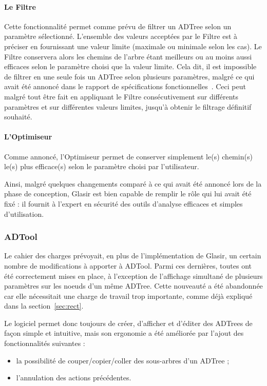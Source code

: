 \paragraph{Le Filtre} Cette fonctionnalité permet comme prévu de filtrer un ADTree selon un paramètre sélectionné. L'ensemble des valeurs acceptées par le Filtre est à préciser en fournissant une valeur limite (maximale ou minimale selon les cas). Le Filtre conservera alors les chemins de l'arbre étant meilleurs ou au moins aussi efficaces selon le paramètre choisi que la valeur limite. Cela dit, il est impossible de filtrer en une seule fois un ADTree selon plusieurs paramètres, malgré ce qui avait été annoncé dans le rapport de spécifications fonctionnelles~\cite{spec_fonc}. Ceci peut malgré tout être fait en appliquant le Filtre consécutivement sur différents paramètres et sur différentes valeurs limites, jusqu'à obtenir le filtrage définitif souhaité.

\paragraph{L'Optimiseur} Comme annoncé, l'Optimiseur permet de conserver simplement le(s) chemin(s) le(s) plus efficace(s) selon le paramètre choisi par l'utilisateur. 

Ainsi, malgré quelques changements comparé à ce qui avait été annoncé lors de la phase de conception, Glasir est bien capable de remplir le rôle qui lui avait été fixé :  il fournit à l'expert en sécurité des outils d'analyse efficaces et simples d'utilisation.

\subsubsection{ADTool}
\label{sssec:obj_adtool}

Le cahier des charges prévoyait, en plus de l'implémentation de Glasir, un certain nombre de modifications à apporter à ADTool. Parmi ces dernières, toutes ont été correctement mises en place, à l'exception de l'affichage simultané de plusieurs paramètres sur les noeuds d'un même ADTree. Cette nouveauté a été abandonnée car elle nécessitait une charge de travail trop importante, comme déjà expliqué dans la {\sc section}~\ref{sec:rect}.

Le logiciel permet donc toujours de créer, d'afficher et d'éditer des ADTrees de façon simple et intuitive, mais son ergonomie a été améliorée par l'ajout des fonctionnalités suivantes :
\begin{itemize}
    \item la possibilité de couper/copier/coller des sous-arbres d'un ADTree ;
    \item l'annulation des actions précédentes.
\end{itemize}

